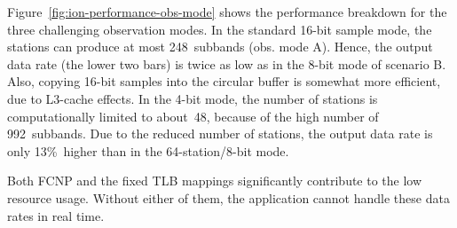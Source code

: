 \documentclass{sig-alternate}
\begin{document}
Figure~\ref{fig:ion-performance-obs-mode} shows the performance breakdown
for the three challenging observation modes.
In the standard 16-bit sample mode, the stations can produce at most
248~subbands (obs. mode A).
Hence, the output data rate (the lower two bars) is twice as low as in the
8-bit mode of scenario B.
Also, copying 16-bit samples into the circular buffer is somewhat more
efficient, due to L3-cache effects.
In the 4-bit mode, the number of stations is computationally limited to
about~48, because of the high number of 992~subbands.
Due to the reduced number of stations, the output data rate is only 13\%~higher
than in the 64-station/8-bit mode.



Both FCNP and the fixed TLB mappings significantly contribute to the low
resource usage.
Without either of them, the application cannot handle these data rates in
real time.
\end{document}
